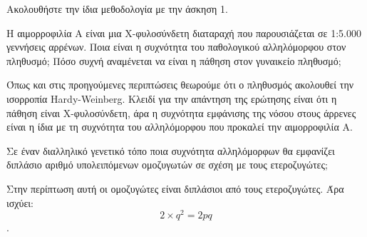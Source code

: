 \begin{refsection}
\begin{exercises}[Ασκήσεις]
\begin{writesolutionsI}
Ακολουθήστε την ίδια μεθοδολογία με την άσκηση 1.
\end{writesolutionsI}
\item H αιμορροφιλία Α είναι μια Χ-φυλοσύνδετη διαταραχή που παρουσιάζεται σε 1:5.000 γεννήσεις αρρένων. Ποια είναι η συχνότητα του παθολογικού αλληλόμορφου στον πληθυσμό; Πόσο συχνή αναμένεται να είναι η πάθηση στον γυναικείο πληθυσμό;
\begin{writesolutionsI}
Όπως και στις προηγούμενες περιπτώσεις θεωρούμε ότι ο πληθυσμός ακολουθεί την ισορροπία Hardy-Weinberg. Κλειδί για την απάντηση της ερώτησης είναι ότι η πάθηση είναι Χ-φυλοσύνδετη, άρα η συχνότητα εμφάνισης της νόσου στους άρρενες είναι η ίδια με τη συχνότητα του αλληλόμορφου που προκαλεί την αιμορροφιλία Α.
\end{writesolutionsI}
\item Σε έναν διαλληλικό γενετικό τόπο ποια συχνότητα αλληλόμορφων θα εμφανίζει διπλάσιο αριθμό υπολειπόμενων ομοζυγωτών σε σχέση με τους ετεροζυγώτες;
\begin{writesolutionsI} Στην περίπτωση αυτή οι ομοζυγώτες είναι διπλάσιοι από τους ετεροζυγώτες. Άρα ισχύει: $$2\times q^2=2pq$$.
\end{writesolutionsI}
\end{exercises}
\closesolutionsI


\end{refsection}
